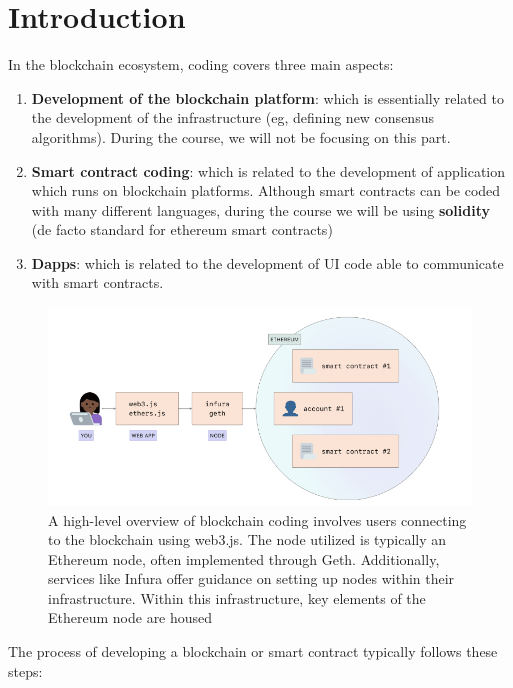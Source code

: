 \section*{Introduction}



In the blockchain ecosystem, coding covers three main aspects:
\begin{enumerate}
    \item \textbf{Development of the blockchain platform}: which is essentially related to the development of the infrastructure (eg, defining new consensus algorithms). During the course, we will not be focusing on this part.
    \item \textbf{Smart contract coding}: which is related to the development of application which runs on blockchain platforms. Although smart contracts can be coded with many different languages, during the course we will be using \textbf{solidity} (de facto standard for ethereum smart contracts)
    \item \textbf{Dapps}: which is related to the development of UI code able to communicate with smart contracts.
\end{enumerate}

\begin{figure}[ht]
    \centering
    \includegraphics[width=0.75\linewidth]{tikz/appendix - Coding.png}
    \caption{\small A high-level overview of blockchain coding involves users connecting to the blockchain using web3.js. The node utilized is typically an Ethereum node, often implemented through Geth. Additionally, services like Infura offer guidance on setting up nodes within their infrastructure. Within this infrastructure, key elements of the Ethereum node are housed}
    \label{fig:into to blockchain coding}
\end{figure}



The process of developing a blockchain or smart contract typically follows these steps:

